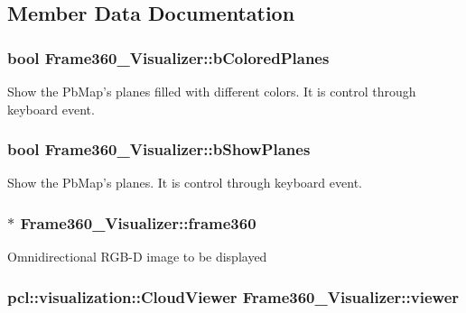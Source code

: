 \subsection{Member Data Documentation}
\hypertarget{classFrame360__Visualizer_af8ae6b320b3b6febd5bd4828a26a2a2b}{
\subsubsection[{b\-Colored\-Planes}]{\setlength{\rightskip}{0pt plus 5cm}bool Frame360\-\_\-\-Visualizer\-::b\-Colored\-Planes\hspace{0.3cm}{\ttfamily [private]}}}\label{classFrame360__Visualizer_af8ae6b320b3b6febd5bd4828a26a2a2b}
Show the Pb\-Map's planes filled with different colors. It is control through keyboard event. \hypertarget{classFrame360__Visualizer_a39aaf9c225e5cf22e2c10a184544ad0f}{
\subsubsection[{b\-Show\-Planes}]{\setlength{\rightskip}{0pt plus 5cm}bool Frame360\-\_\-\-Visualizer\-::b\-Show\-Planes\hspace{0.3cm}{\ttfamily [private]}}}\label{classFrame360__Visualizer_a39aaf9c225e5cf22e2c10a184544ad0f}
Show the Pb\-Map's planes. It is control through keyboard event. \hypertarget{classFrame360__Visualizer_a44e5734ed91fe3a08034fe6f6d204ed8}{
\subsubsection[{frame360}]{$\ast$ Frame360\-\_\-\-Visualizer\-::frame360}}\label{classFrame360__Visualizer_a44e5734ed91fe3a08034fe6f6d204ed8}
Omnidirectional R\-G\-B-\/\-D image to be displayed \hypertarget{classFrame360__Visualizer_a0fa4172237791194dce989b0d88eb1b6}{
\subsubsection[{viewer}]{\setlength{\rightskip}{0pt plus 5cm}pcl\-::visualization\-::\-Cloud\-Viewer Frame360\-\_\-\-Visualizer\-::viewer}}\label{classFrame360__Visualizer_a0fa4172237791194dce989b0d88eb1b6}
